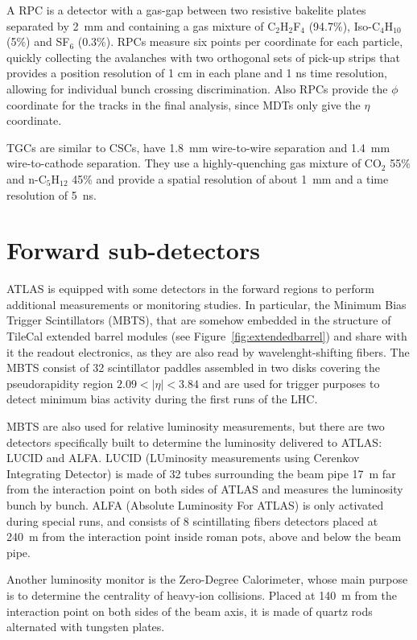 A RPC is a detector with a gas-gap between two resistive bakelite plates separated by 2~mm and containing
a gas mixture of C$_{2}$H$_{2}$F$_{4}$ (94.7\%), Iso-C$_{4}$H$_{10}$ (5\%) and SF$_{6}$ (0.3\%). 
RPCs measure six points per coordinate for each particle, quickly collecting the avalanches with two 
orthogonal sets of pick-up strips that provides a position resolution of 1 cm in each plane and 1 ns time resolution,
allowing for individual bunch crossing discrimination. Also RPCs provide the $\phi$ coordinate for the tracks in
the final analysis, since MDTs only give the $\eta$ coordinate.

TGCs are similar to CSCs, have 1.8~mm wire-to-wire separation and 
1.4~mm wire-to-cathode separation. They use a highly-quenching gas mixture of CO$_{2}$ 55\% and n-C$_{5}$H$_{12}$ 45\%
and provide  a spatial resolution of about 1~mm and a time resolution of 5~ns.

\section{Forward sub-detectors}\label{sec:forward}

ATLAS is equipped with some detectors in the forward regions to perform additional measurements or
monitoring studies. In particular, the Minimum Bias Trigger Scintillators (MBTS), that are somehow
embedded in the structure of TileCal extended barrel modules (see Figure~\ref{fig:extendedbarrel})
and share with it the readout electronics, as they are also read by wavelenght-shifting fibers.
The MBTS consist of 32 scintillator paddles assembled in two disks covering the pseudorapidity region
$2.09<|\eta|<3.84$ and are used for trigger purposes to detect minimum bias activity during the first
runs of the LHC. 

MBTS are also used for relative luminosity measurements, but there are two detectors specifically
built to determine the luminosity delivered to ATLAS: LUCID and ALFA. LUCID (LUminosity measurements
using Cerenkov Integrating Detector) is made of 32 tubes surrounding the beam pipe 17~m
far from the interaction point on both sides of ATLAS and measures the luminosity bunch by bunch.
ALFA (Absolute Luminosity For ATLAS) is only activated during special runs, and consists of 8 
scintillating fibers detectors placed at 240~m from the interaction point inside roman pots, above and
below the beam pipe.

Another luminosity monitor is the Zero-Degree Calorimeter, whose main purpose is to determine the centrality of heavy-ion
collisions. Placed at 140~m from the interaction point on both sides of the beam axis,
it is made of quartz rods
alternated with tungsten plates.

